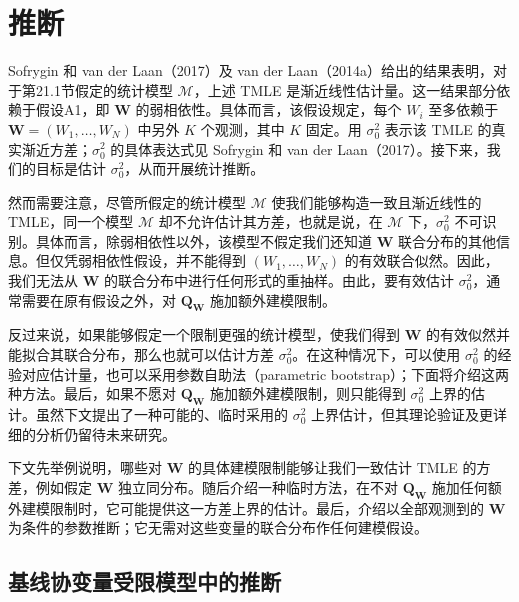 \section{推断}

Sofrygin 和 van der Laan（2017）及 van der Laan（2014a）给出的结果表明，对于第21.1节假定的统计模型 $\mathcal M$，上述 TMLE 是渐近线性估计量。这一结果部分依赖于假设A1，即 $\bm W$ 的弱相依性。具体而言，该假设规定，每个 $W_i$ 至多依赖于 $\bm W=(W_1,\ldots,W_N)$ 中另外 $K$ 个观测，其中 $K$ 固定。用 $\sigma_0^2$ 表示该 TMLE 的真实渐近方差；$\sigma_0^2$ 的具体表达式见 Sofrygin 和 van der Laan（2017）。接下来，我们的目标是估计 $\sigma_0^2$，从而开展统计推断。

然而需要注意，尽管所假定的统计模型 $\mathcal M$ 使我们能够构造一致且渐近线性的 TMLE，同一个模型 $\mathcal M$ 却不允许估计其方差，也就是说，在 $\mathcal M$ 下，$\sigma_0^2$ 不可识别。具体而言，除弱相依性以外，该模型不假定我们还知道 $\bm W$ 联合分布的其他信息。但仅凭弱相依性假设，并不能得到 $(W_1,\ldots,W_N)$ 的有效联合似然。因此，我们无法从 $\bm W$ 的联合分布中进行任何形式的重抽样。由此，要有效估计 $\sigma_0^2$，通常需要在原有假设之外，对 $\bm Q_{\bm W}$ 施加额外建模限制。

反过来说，如果能够假定一个限制更强的统计模型，使我们得到 $\bm W$ 的有效似然并能拟合其联合分布，那么也就可以估计方差 $\sigma_0^2$。在这种情况下，可以使用 $\sigma_0^2$ 的经验对应估计量，也可以采用参数自助法（parametric bootstrap）；下面将介绍这两种方法。最后，如果不愿对 $\bm Q_{\bm W}$ 施加额外建模限制，则只能得到 $\sigma_0^2$ 上界的估计。虽然下文提出了一种可能的、临时采用的 $\sigma_0^2$ 上界估计，但其理论验证及更详细的分析仍留待未来研究。

下文先举例说明，哪些对 $\bm W$ 的具体建模限制能够让我们一致估计 TMLE 的方差，例如假定 $\bm W$ 独立同分布。随后介绍一种临时方法，在不对 $\bm Q_{\bm W}$ 施加任何额外建模限制时，它可能提供这一方差上界的估计。最后，介绍以全部观测到的 $\bm W$ 为条件的参数推断；它无需对这些变量的联合分布作任何建模假设。

\subsection{基线协变量受限模型中的推断}

